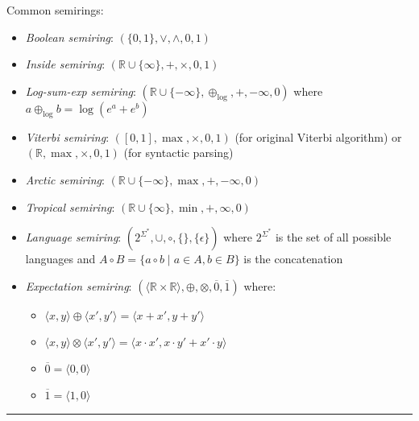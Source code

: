 Common semirings:
\begin{itemize}
    \item \emph{Boolean semiring}: $(\{0, 1\}, \lor, \land, 0, 1)$
    \item \emph{Inside semiring}: $(\mathbb{R} \cup \{\infty\}, +, \times, 0, 1)$
    \item \emph{Log-sum-exp semiring}: $(\mathbb{R} \cup \{-\infty\}, \oplus_{\textrm{log}}, +, -\infty, 0)$ where $a \oplus_{\textrm{log}} b = \log(e^a + e^b)$
    \item \emph{Viterbi semiring}: $([0,1], \max, \times, 0,1)$ (for original Viterbi algorithm) or $(\mathbb{R}, \max, \times, 0,1)$ (for syntactic parsing)
    \item \emph{Arctic semiring}: $(\mathbb{R} \cup \{-\infty\}, \max, +, -\infty, 0)$
    \item \emph{Tropical semiring}: $(\mathbb{R} \cup \{\infty\}, \min, +, \infty, 0)$
    \item \emph{Language semiring}: $(2^{\Sigma^*}, \cup, \circ, \{\}, \{\epsilon\})$ where $2^{\Sigma^*}$ is the set of all possible languages and $A \circ B = \{a \circ b \mid a \in A, b \in B\}$ is the concatenation
    \item \emph{Expectation semiring}: $
    ( \langle \mathbb{R} \times \mathbb{R} \rangle, \oplus, \otimes, \overline{0}, \overline{1} )
    $ where:
    \begin{itemize}
        \item
        $
        \langle x, y \rangle \oplus \langle x', y' \rangle = \langle x + x', y + y' \rangle
        $
        \item $
        \langle x, y \rangle \otimes \langle x', y' \rangle = \langle x \cdot x', x \cdot y' + x' \cdot y \rangle$
        \item $\overline{0} = \langle 0,0 \rangle$
        \item $\overline{1} = \langle 1,0 \rangle$
    \end{itemize}
\end{itemize}

{\color{black}\hrule height 0.001mm}

